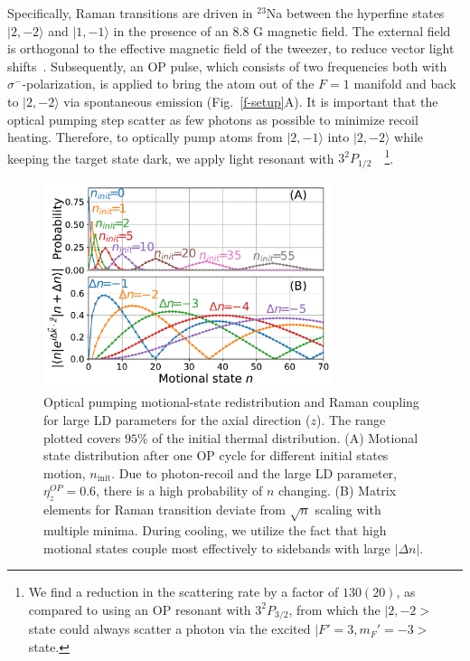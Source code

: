 \documentclass[aps,prl,twocolumn,groupedaddress]{revtex4-1}
\begin{document}
Specifically, Raman transitions are driven in $^{23}$Na between the hyperfine states
$|2, -2\rangle$ and $|1, -1\rangle$ in the presence of an $8.8$ G magnetic field. The external field is
orthogonal to the effective magnetic field of the tweezer, to reduce vector light shifts~\cite{Kaufman2012,Thompson2013}.
Subsequently, an OP pulse, which consists of two frequencies both with $\sigma^-$-polarization, is applied to bring the atom out of the $F=1$ manifold and back to $|2, -2\rangle$ via spontaneous emission (Fig.~\ref{f-setup}A).
It is important that the optical pumping step scatter as few photons as possible to minimize recoil heating. %
Therefore, to optically pump atoms from $|2,-1\rangle$ into $|2, -2\rangle$ while keeping the target state dark, we apply light resonant with $3^2P_{1/2}$~\cite{Monroe1995, Grobner2017}~\footnote{We find a reduction in the scattering rate by a factor of $130(20)$, as compared to using an OP resonant with $3^2P_{3/2}$, from which the $|2, -2>$ state could always scatter a photon via the excited $|F'=3, m_F'=-3>$ state.}.

\begin{figure}[b]
  \includegraphics[width=8.5cm]{imgs/fig2_raman_op.pdf}
  \caption{Optical pumping motional-state redistribution and Raman coupling for large LD parameters for the axial direction ($z$). The range plotted covers $95$\% of the initial thermal distribution.
    (A) Motional state distribution %
    after one OP cycle
    for different initial states motion, $n_{\textrm{init}}$. Due to photon-recoil and the large LD parameter, $\eta^{OP}_z=0.6$,
    there is a high probability of $n$ changing.         (B) Matrix elements for Raman transition deviate from
    $\sqrt{n}$ scaling with multiple minima. During cooling, we utilize the fact that high motional states couple most effectively to sidebands with large $|\Delta n|$.
    \label{f-ld}}
\end{figure}
\end{document}
